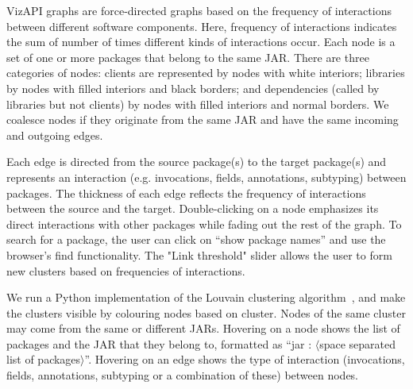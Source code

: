 VizAPI graphs are force-directed graphs based on the frequency of
interactions between different software components. 
Here, frequency of interactions indicates the sum of number of times different kinds of interactions occur.
Each node is a
set of one or more packages that belong to the same JAR.  There are
three categories of nodes: clients are represented by nodes with white
interiors; libraries by nodes with filled interiors and black borders;
and dependencies (called by libraries but not clients) by nodes with
filled interiors and normal borders.  We coalesce nodes if they
originate from the same JAR and have the same incoming and
outgoing edges.

Each edge is directed
from the source package(s) to the target package(s) and represents an interaction 
(e.g. invocations, fields, annotations, subtyping) between packages. 
The thickness of each edge reflects the frequency of interactions between the source and the target.
Double-clicking on a node emphasizes its direct interactions with other packages while fading out the rest of the graph.
To search for a package, the user can click on “show package
names” and use the browser’s find functionality. 
The "Link threshold" slider allows the user to form new clusters based on frequencies of interactions.


We run a Python implementation of the Louvain clustering algorithm~\cite{blondel2008fast}, and make the clusters 
visible by colouring nodes based on cluster.
Nodes of the same cluster may come from the same or different JARs.
Hovering on a node shows the list of packages and 
the JAR that they belong to, 
formatted as “jar : $\langle$space separated list of packages$\rangle$”. 
Hovering on an edge shows the type of interaction (invocations, fields, annotations, subtyping or a combination of these) between nodes.
